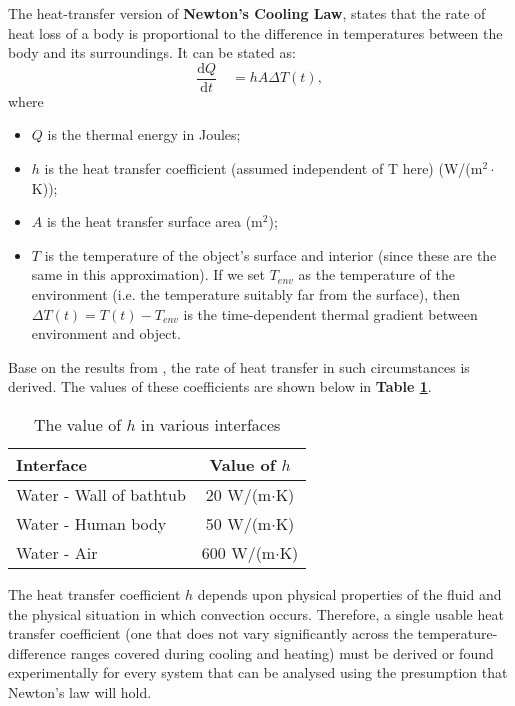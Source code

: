 \documentclass{HZNUMCM}
\begin{document}
The heat-transfer version of \textbf{Newton's Cooling Law}, states that the rate of heat loss of a
body is proportional to the difference in temperatures between the body and its surroundings. It can
be stated as:
\begin{equation}\label{n}
\frac{\mathrm{d}Q}{\mathrm{d}t}\quad=hA\Delta T(t),
\end{equation}
where
\begin{itemize}
    \item $Q$ is the thermal energy in Joules;
    \item $h$ is the heat transfer coefficient (assumed independent of T here) (W/(m$^2\cdot$K));
    \item $A$ is the heat transfer surface area (m$^2$);
    \item $T$ is the temperature of the object's surface and interior (since these are the same in
    this approximation). If we set $T_{env}$ as the temperature of the environment (i.e. the
    temperature suitably far from the surface), then $\Delta T(t)=T(t)-T_{env} $ is the
    time-dependent thermal gradient between environment and object.
\end{itemize}

Base on the results from \cite{2011_Ozturk_1532,2010_nakata_MR2680013,2009_li_R2451705,2009_muroya_MR2481600}, the rate of heat transfer in such circumstances is derived. The
values of these coefficients are shown below in \textbf{Table \ref{h}}.
\begin{table}[!htbp]
\begin{center}
\caption{The value of $h$ in various interfaces}
\begin{tabular}{lc}
    \toprule
    Interface& Value of $h$\\
    \midrule
    Water - Wall of bathtub&20 W/(m$\cdot$K)\\
    Water - Human body&50 W/(m$\cdot$K)\\
    Water - Air&600 W/(m$\cdot$K)\\
    \bottomrule
\end{tabular}\label{h}
\end{center}
\end{table}

The heat transfer coefficient $h$ depends upon physical properties of the fluid and the physical
situation in which convection occurs. Therefore, a single usable heat transfer coefficient (one that
does not vary significantly across the temperature-difference ranges covered during cooling and
heating) must be derived or found experimentally for every system that can be analysed using the
presumption that Newton's law will hold.
\end{document}
